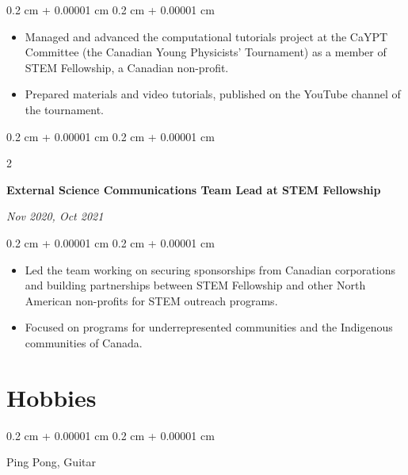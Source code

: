 \documentclass[10pt, letterpaper]{article}
\newenvironment{highlights}{
    \begin{itemize}[
        topsep=0.05 cm,
        parsep=0.04 cm,
        partopsep=0pt,
        itemsep=0pt,
        leftmargin=0.4 cm + 10pt
    ]
}{
    \end{itemize}
} %
\newenvironment{onecolentry}{
    \begin{adjustwidth}{
        0.2 cm + 0.00001 cm
    }{
        0.2 cm + 0.00001 cm
    }
}{
    \end{adjustwidth}
} %
\newenvironment{twocolentry}[2][]{
    \onecolentry
    \def\secondColumn{#2}
    \setcolumnwidth{\fill, 4.5 cm}
    \begin{paracol}{2}
}{
    \switchcolumn \raggedleft \secondColumn
    \end{paracol}
    \endonecolentry
} %
\begin{document}
        \vspace{0.10 cm}
        \begin{onecolentry}
            \begin{highlights}
                \item Managed and advanced the computational tutorials project at the CaYPT Committee (the Canadian Young Physicists' Tournament) as a member of STEM Fellowship, a Canadian non-profit.
                \item Prepared materials and video tutorials, published on the YouTube channel of the tournament.
            \end{highlights}
        \end{onecolentry}

        \vspace{0.2 cm}

        \begin{twocolentry}{
            
            
        \textit{Nov 2020, Oct 2021}}
            \textbf{External Science Communications Team Lead at STEM Fellowship}
        \end{twocolentry}

        \vspace{0.10 cm}
        \begin{onecolentry}
            \begin{highlights}
                \item Led the team working on securing sponsorships from Canadian corporations and building partnerships between STEM Fellowship and other North American non-profits for STEM outreach programs.
                \item Focused on programs for underrepresented communities and the Indigenous communities of Canada.
            \end{highlights}
        \end{onecolentry}

	\section{Hobbies}
	\begin{onecolentry}

        Ping Pong, Guitar
    \end{onecolentry}

\end{document}
